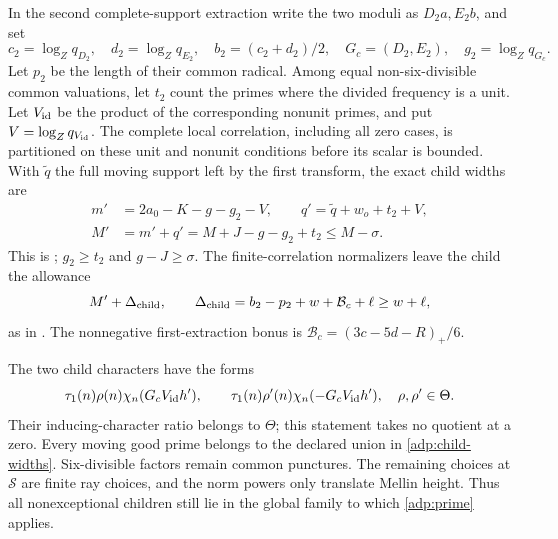 In the second complete-support extraction write the two moduli as
$D_2a,E_2b$, and set
\[
 c_2=\log_Zq_{D_2},\quad d_2=\log_Zq_{E_2},\quad
 b_2=(c_2+d_2)/2,\quad G_c=(D_2,E_2),\quad g_2=\log_Zq_{G_c}.
\]
Let $p_2$ be the length of their common radical. Among equal
non-six-divisible common valuations, let $t_2$ count the primes
where the divided frequency is a unit. Let $V_{\rm id}$ be the
product of the corresponding nonunit primes, and put
$V=\log_Zq_{V_{\rm id}}$.
The complete local correlation, including all zero cases, is
partitioned on these unit and nonunit conditions before its scalar
is bounded. With $\widetilde q$ the full moving support left by the
first transform, the exact child widths are
\begin{align}
 m'&=2a_0-K-g-g_2-V,\qquad
 q'=\widetilde q+w_o+t_2+V,\label{adp:child-widths}\\
 M'&=m'+q'=M+J-g-g_2+t_2\le M-\sigma .
 \label{adp:width-drop}
\end{align}
This is \cite[(18.32)]{OAI26}; $g_2\ge t_2$ and $g-J\ge\sigma$.
The finite-correlation normalizers leave the child the allowance
\begin{equation}\label{adp:child-allowance}
 M'+\Delta_{\rm child},\qquad
 \Delta_{\rm child}=b_2-p_2+w+\mathcal B_c+\ell\ge w+\ell ,
\end{equation}
as in \cite[(18.33)]{OAI26}. The nonnegative first-extraction bonus
is $\mathcal B_c=(3c-5d-R)_+/6$.

The two child characters have the forms
\[
 \tau_1(n)\rho(n)\chi_n(G_cV_{\rm id}h'),\qquad
 \tau_1(n)\rho'(n)\chi_n(-G_cV_{\rm id}h'),\quad \rho,\rho'\in\Theta .
\]
Their inducing-character ratio belongs to $\Theta$; this statement
takes no quotient at a zero. Every moving good prime belongs to the
declared union in \eqref{adp:child-widths}. Six-divisible factors
remain common punctures. The remaining choices at $\mathcal S$
are finite ray choices, and the norm powers only translate Mellin
height. Thus all nonexceptional children still lie in the global
family to which \eqref{adp:prime} applies.

